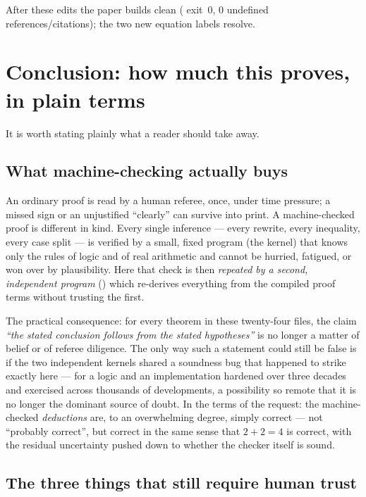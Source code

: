 \documentclass[11pt]{article}
\newcommand{\coq}[1]{\texttt{\detokenize{#1}}}
\begin{document}
\noindent
After these edits the paper builds clean (\coq{latexmk} exit~0, $0$ undefined
references/citations); the two new equation labels resolve.

\section{Conclusion: how much this proves, in plain terms}\label{sec:conclusion}

It is worth stating plainly what a reader should take away.

\subsection{What machine-checking actually buys}

An ordinary proof is read by a human referee, once, under time pressure; a
missed sign or an unjustified ``clearly'' can survive into print. A
machine-checked proof is different in kind. Every single inference --- every
rewrite, every inequality, every case split --- is verified by a small, fixed
program (the kernel) that knows only the rules of logic and of real arithmetic
and cannot be hurried, fatigued, or won over by plausibility. Here that check
is then \emph{repeated by a second, independent program} (\coq{coqchk}) which
re-derives everything from the compiled proof terms without trusting the first.

The practical consequence: for every theorem in these twenty-four files, the claim
\emph{``the stated conclusion follows from the stated hypotheses''} is no longer
a matter of belief or of referee diligence. The only way such a statement could
still be false is if the two independent kernels shared a soundness bug that
happened to strike exactly here --- for a logic and an implementation hardened
over three decades and exercised across thousands of developments, a
possibility so remote that it is no longer the dominant source of doubt. In the
terms of the request: the machine-checked \emph{deductions} are, to an
overwhelming degree, simply correct --- not ``probably correct'', but correct in
the same sense that $2+2=4$ is correct, with the residual uncertainty pushed
down to whether the checker itself is sound.

\subsection{The three things that still require human trust}
\end{document}
